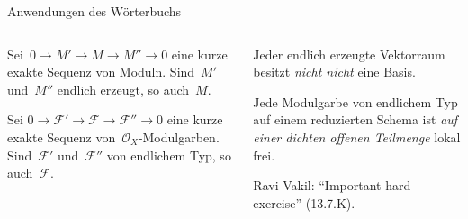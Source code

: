 \documentclass[12pt,utf8,notheorems,compress,t]{beamer}
\newcommand{\F}{\mathcal{F}}
\renewcommand{\O}{\mathcal{O}}
\renewcommand{\_}{\mathpunct{.}}
\newcommand{\?}{\,{:}\,}
\begin{document}
\begin{frame}{Anwendungen des Wörterbuchs}
  \vspace*{-2em}
  \begin{columns}[t]
    \begin{column}{0.51\textwidth}
      \begin{center}
        \begin{exampleblock}{}
          \justifying
          Sei~$0 \to M' \to M \to M'' \to 0$ eine kurze exakte Sequenz von
          Moduln. Sind~$M'$ und~$M''$ endlich erzeugt, so auch~$M$.
        \end{exampleblock}
        \medskip

        \scalebox{3}{$\Downarrow$}

        \begin{exampleblock}{}
          \justifying
          Sei $0 \to \F' \to \F \to \F'' \to 0$ eine kurze exakte Sequenz
          von~$\O_X$-Modulgarben. Sind~$\F'$ und~$\F''$ von endlichem Typ,
          so auch~$\F$.
        \end{exampleblock}
      \end{center}
    \end{column}
    \pause

    \begin{column}{0.39\textwidth}
      \begin{center}
        \begin{exampleblock}{}
          \justifying
          Jeder endlich erzeugte Vektorraum besitzt \emph{nicht nicht} eine
          Basis.
        \end{exampleblock}
        \medskip

        \scalebox{3}{$\Downarrow$}

        \begin{exampleblock}{}
          \justifying
          Jede Modulgarbe von endlichem Typ auf einem reduzierten Schema ist
          \emph{auf einer dichten offenen Teilmenge} lokal frei.
        \end{exampleblock}
        \centering
        \tiny Ravi Vakil: "`Important hard exercise"' (13.7.K).
        \par
      \end{center}
    \end{column}
  \end{columns}
\end{frame}
\end{document}
